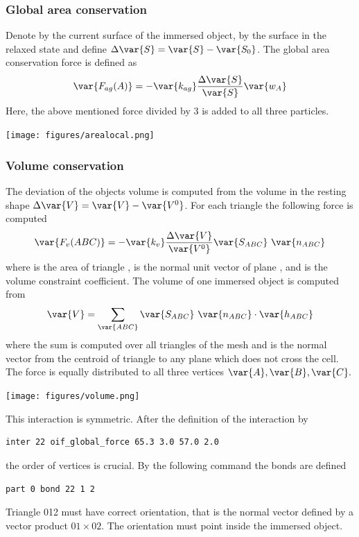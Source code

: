 \subsubsection*{Global area conservation}
Denote by  the 
current surface of the immersed object, by  the surface in the relaxed 
state and define $\Delta \var{S} = \var{S} - \var{S_0}$. The global area conservation 
force is defined as
\begin{equation}
\var{F_{ag}(A)} = - \var{k_{ag}}\frac{\Delta \var{S}}{\var{S}}\var{w_{A}}
\end{equation}
Here, the above mentioned force divided by 3 is added to all three particles.
\begin{center}
  \texttt{[image: figures/arealocal.png]}
\end{center}

\subsubsection*{Volume conservation}
The deviation of the objects volume  is computed from the volume in 
the resting shape $\Delta \var{V} = \var{V} - \var{V^0}$. For each triangle the following 
force is computed
\begin{equation}
\var{F_v(ABC)} = -\var{k_v}\frac{\Delta \var{V}}{\var{V^0}} \var{S_{ABC}}\ \var{n_{ABC}}
\end{equation}
where  is the area of triangle ,  is the normal unit 
vector of plane , and  is the volume constraint coefficient. The volume 
of one immersed object is computed from
\begin{equation}
\var{V} = \sum_{\var{ABC}}\var{S_{ABC}}\ \var{n_{ABC}}\cdot \var{h_{ABC}}
\end{equation}
where the sum is computed over all triangles of the mesh and  is the normal 
vector from the centroid of triangle  to any plane which does not cross the cell. 
The force  is equally distributed to all three vertices $\var{A},\var{B},
\var{C}.$

\begin{center}
  \texttt{[image: figures/volume.png]}
\end{center}

This interaction is symmetric. After the definition of the interaction by 
\begin{verbatim} 
inter 22 oif_global_force 65.3 3.0 57.0 2.0
\end{verbatim}
the order of vertices is crucial. By the following command the bonds are defined
\begin{verbatim} 
part 0 bond 22 1 2
\end{verbatim}
Triangle 012 must have correct orientation, that is the normal vector defined by a 
vector product $01\times02$. The orientation must point inside the immersed object.

